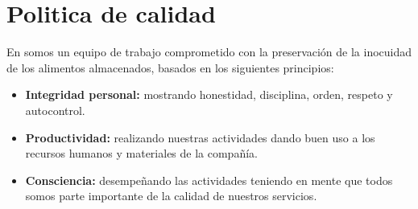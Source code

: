 \renewcommand{\MayorVer}{2}
\renewcommand{\MenorVer}{0}
\renewcommand{\Codigo}{BPD-1-POL}
\renewcommand{\FechaPub}{2023--01}
\renewcommand{\Titulo}{Politica de calidad}


\section{\Titulo} 

En  somos un equipo de trabajo comprometido con la preservación de la inocuidad de los alimentos almacenados, basados en los siguientes principios:

\begin{itemize}
	\item \textbf{Integridad personal:} mostrando honestidad, disciplina, orden, respeto y autocontrol.
	\item \textbf{Productividad:} realizando nuestras actividades dando buen uso a los recursos humanos y materiales de la compañía.
	\item \textbf{Consciencia:} desempeñando las actividades teniendo en mente que todos somos parte importante de la calidad de nuestros servicios.
\end{itemize}